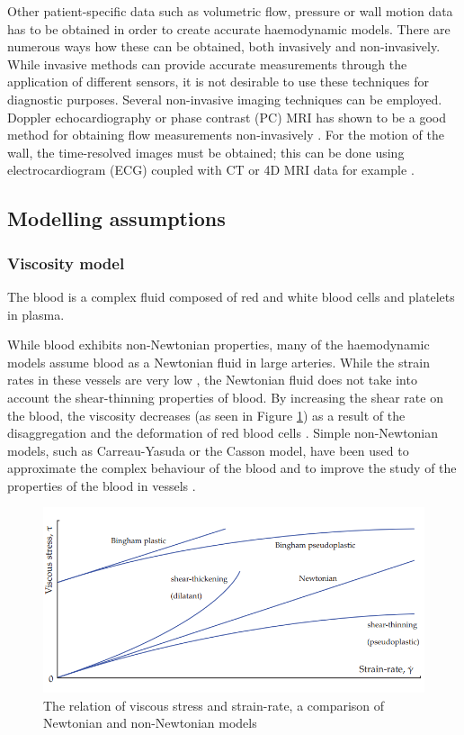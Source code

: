 Other patient-specific data such as volumetric flow, pressure  or wall motion data has to be obtained in order to create accurate haemodynamic models. There are numerous ways how these can be obtained, both invasively and non-invasively. While invasive methods can provide accurate measurements through the application of different sensors, it is not desirable to use these techniques for diagnostic purposes. Several non-invasive imaging techniques can be employed. Doppler echocardiography or phase contrast (PC) MRI has shown to be a good method for obtaining flow measurements non-invasively \cite{Whitlock2015NoninvasiveAorta}. For the motion of the wall, the time-resolved images must be obtained; this can be done using electrocardiogram (ECG) coupled with CT or 4D MRI data for example \cite{Bonfanti2017ComputationalData,Alimohammadi2015AorticUnderstanding}.

\subsection{Modelling assumptions}

\subsubsection{Viscosity model}
The blood is a complex fluid composed of red and white blood cells and platelets in plasma.\par

While blood exhibits non-Newtonian properties, many of the haemodynamic models assume blood as a Newtonian fluid in large arteries. While the strain rates in these vessels are very low \cite{Fung1997BiomechanicsCirculation}, the Newtonian fluid does not take into account the shear-thinning properties of blood. By increasing the shear rate on the blood, the viscosity decreases (as seen in Figure \ref{fig:visc}) as a result of the disaggregation and the deformation of red blood cells \cite{Gijsen1999TheModel,Cho1991EffectsFlows}. Simple non-Newtonian models, such as Carreau-Yasuda or the Casson model, have been used to approximate the complex behaviour of the blood and to improve the study of the properties of the blood in vessels  \cite{Alimohammadi2015PredictingApproach}. \par

\begin{figure}[ht!]
\centering
\includegraphics[width=\textwidth]{Figures/viscosity}
\caption{The relation of viscous stress and strain-rate, a comparison of Newtonian and non-Newtonian models \cite{Gabriel2017THEGROWTH}}
\label{fig:visc}
\end{figure}

